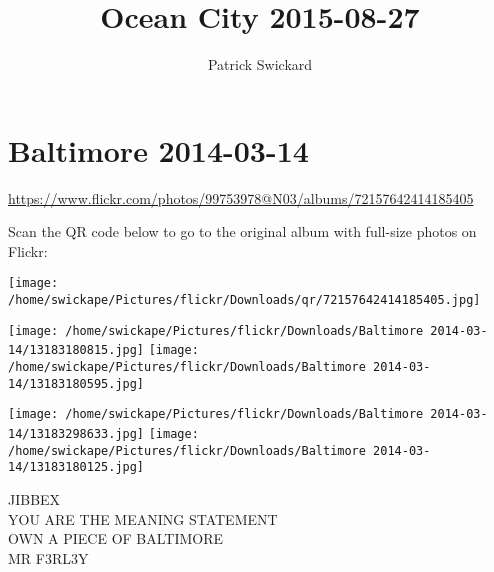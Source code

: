\documentclass[10pt,letterpaper]{article}
\title{Ocean City 2015-08-27}
\author{Patrick Swickard}
\date{}
\begin{document}
\section*{Baltimore 2014-03-14}

\url{https://www.flickr.com/photos/99753978@N03/albums/72157642414185405}

Scan the QR code below to go to the original album with full-size photos on Flickr:

\texttt{[image: /home/swickape/Pictures/flickr/Downloads/qr/72157642414185405.jpg]}
\pagebreak

\texttt{[image: /home/swickape/Pictures/flickr/Downloads/Baltimore 2014-03-14/13183180815.jpg]}
\texttt{[image: /home/swickape/Pictures/flickr/Downloads/Baltimore 2014-03-14/13183180595.jpg]}

\texttt{[image: /home/swickape/Pictures/flickr/Downloads/Baltimore 2014-03-14/13183298633.jpg]}
\texttt{[image: /home/swickape/Pictures/flickr/Downloads/Baltimore 2014-03-14/13183180125.jpg]}

JIBBEX\\
YOU ARE THE MEANING STATEMENT\\
OWN A PIECE OF BALTIMORE\\
MR F3RL3Y
\pagebreak
\end{document}
